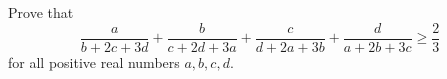 Prove that
\[ \frac{a}{b+2c+3d} + \frac{b}{c+2d+3a} + \frac{c}{d+2a+3b} + \frac{d}{a+2b+3c} \geq \frac{2}{3} \]
for all positive real numbers $a, b, c, d$.

